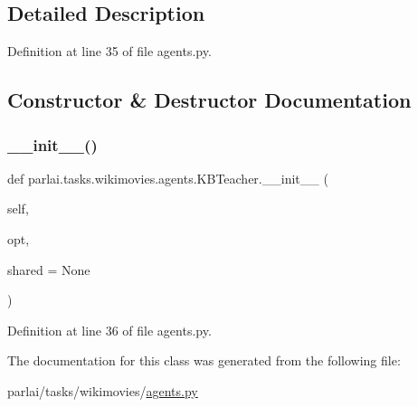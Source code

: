 \subsection{Detailed Description}


Definition at line 35 of file agents.\+py.



\subsection{Constructor \& Destructor Documentation}
\mbox{\label{classparlai_1_1tasks_1_1wikimovies_1_1agents_1_1KBTeacher_af07082cfcac7b822a87ed83493dae616}} 
\subsubsection{\texorpdfstring{\+\_\+\+\_\+init\+\_\+\+\_\+()}{\_\_init\_\_()}}
{\footnotesize\ttfamily def parlai.\+tasks.\+wikimovies.\+agents.\+K\+B\+Teacher.\+\_\+\+\_\+init\+\_\+\+\_\+ (\begin{DoxyParamCaption}\item[{}]{self,  }\item[{}]{opt,  }\item[{}]{shared = {\ttfamily None} }\end{DoxyParamCaption})}



Definition at line 36 of file agents.\+py.



The documentation for this class was generated from the following file\+:\begin{DoxyCompactItemize}
\item 
parlai/tasks/wikimovies/\hyperlink{parlai_2tasks_2wikimovies_2agents_8py}{agents.\+py}\end{DoxyCompactItemize}

